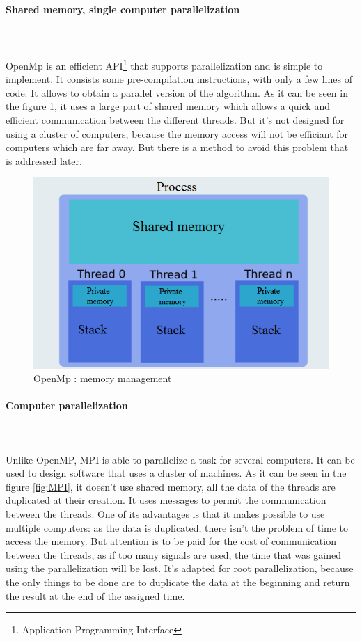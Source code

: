 \paragraph{Shared memory, single computer parallelization}\mbox{}\\\mbox{}\\
OpenMp is an efficient API\footnote{Application Programming Interface} that supports parallelization and is simple to implement. It consists some pre-compilation instructions, with only a few lines of code. It allows to obtain a parallel version of the algorithm. As it can be seen in the figure \ref{fig:OpenMp}, it uses a large part of shared memory which allows a quick and efficient communication between the different threads. But it's not designed for using a cluster of computers, because the memory access will not be efficiant for computers which are far away. But there is a method to avoid this problem that is addressed later.
\begin{figure}[!h] 
\centerline{\includegraphics[scale=0.50]{3_Software_considered/MultithreadingMP_boost_Visual_MPI_5000_Zotero_Project_Baptiste/OpenMP}}
   \caption{\label{étiquette} OpenMp : memory management}
\label{fig:OpenMp}
\end{figure}
\newpage
\paragraph{Computer parallelization}\mbox{}\\\mbox{}\\
Unlike OpenMP, MPI is able to parallelize a task for several computers. It can be used to design software that uses a cluster of machines. As it can be seen in the figure \ref{fig:MPI}, it doesn't use shared memory, all the data of the threads are duplicated at their creation. It uses messages to permit the communication between the threads. One of its advantages is that it makes possible to use multiple computers: as the data is duplicated, there isn't the problem of time to access the memory. But attention is to be paid for the cost of communication between the threads, as if too many signals are used, the time that was gained using the parallelization will be lost. It's adapted for root parallelization, because the only things to be done are to duplicate the data at the beginning and return the result at the end of the assigned time.

